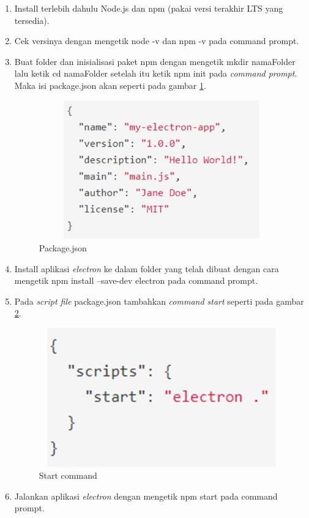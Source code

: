 \begin{enumerate}
    \item Install terlebih dahulu Node.js dan npm (pakai versi terakhir LTS yang tersedia).
    \item Cek versinya dengan mengetik node -v dan npm -v pada command prompt.
    \item Buat folder dan inisialisasi paket npm dengan mengetik mkdir namaFolder lalu ketik cd namaFolder setelah itu ketik npm init pada \textit{command prompt}. Maka isi package.json akan seperti pada gambar \ref{fig:gambarJson}.
    
    \begin{figure}[H]
        \centering
        \includegraphics[width=12cm, height=6cm]{Gambar/Package Json.jpg}
        \caption{Package.json}
        \label{fig:gambarJson}
    \end{figure}
    \item Install aplikasi \textit{electron} ke dalam folder yang telah dibuat dengan cara mengetik npm install --save-dev electron pada command prompt.
    \item Pada \textit{script file} package.json tambahkan \textit{command start} seperti pada gambar \ref{fig:startCommand}.
    
    \begin{figure}[H]
        \centering
        \includegraphics[width=12cm, height=6cm]{Gambar/json file.jpg}
        \caption{Start command}
        \label{fig:startCommand}
    \end{figure}
    \item Jalankan aplikasi \textit{electron} dengan mengetik npm start pada command prompt.
\end{enumerate}





